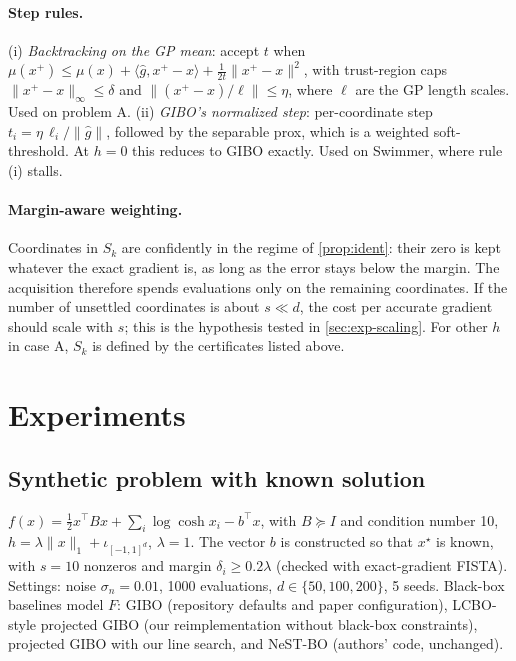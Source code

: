 \documentclass[10pt]{article}
\theoremstyle{remark}
\begin{document}
\paragraph{Step rules.} (i) \emph{Backtracking on the GP mean}: accept $t$ when
$\mu(x^+)\le\mu(x)+\langle\hat g,x^+-x\rangle+\frac1{2t}\|x^+-x\|^2$, with trust-region caps $\|x^+-x\|_\infty\le\delta$ and
$\|(x^+-x)/\ell\|\le\eta$, where $\ell$ are the GP length scales. Used on problem A. (ii) \emph{GIBO's normalized step}: per-coordinate step
$t_i=\eta\,\ell_i/\|\hat g\|$, followed by the separable prox, which is a weighted soft-threshold. At $h=0$ this reduces to GIBO exactly. Used on
Swimmer, where rule (i) stalls.

\paragraph{Margin-aware weighting.} Coordinates in $S_k$ are confidently in the regime of \cref{prop:ident}: their zero is kept whatever the exact
gradient is, as long as the error stays below the margin. The acquisition therefore spends evaluations only on the remaining coordinates. If the
number of unsettled coordinates is about $s\ll d$, the cost per accurate gradient should scale with $s$; this is the hypothesis tested in
\cref{sec:exp-scaling}. For other $h$ in case A, $S_k$ is defined by the certificates listed above.

\section{Experiments}\label{sec:exp}

\subsection{Synthetic problem with known solution}
$f(x)=\tfrac12x^\top Bx+\sum_i\log\cosh x_i-b^\top x$, with $B\succeq I$ and condition number 10, $h=\lambda\|x\|_1+\iota_{[-1,1]^d}$, $\lambda=1$.
The vector $b$ is constructed so that $x^\star$ is known, with $s=10$ nonzeros and margin $\delta_i\ge0.2\lambda$ (checked with exact-gradient FISTA).
Settings: noise $\sigma_n=0.01$, 1000 evaluations, $d\in\{50,100,200\}$, 5 seeds.
Black-box baselines model $F$: GIBO \citep{muller2021gibo} (repository defaults and paper configuration), LCBO-style projected GIBO
\citep{jing2026lcbo} (our reimplementation without black-box constraints), projected GIBO with our line search, and NeST-BO \citep{tang2026nestbo}
(authors' code, unchanged).
\end{document}

